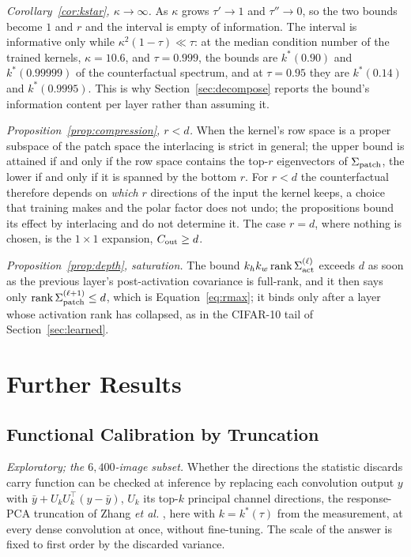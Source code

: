 \documentclass[10pt,journal,compsoc]{IEEEtran}
\begin{document}
\emph{Corollary~\ref{cor:kstar}, $\kappa \to \infty$.} As $\kappa$ grows $\tau' \to 1$ and $\tau'' \to 0$, so the two bounds become $1$ and $r$ and the interval is empty of information. The interval is informative only while $\kappa^2 (1 - \tau) \ll \tau$: at the median condition number of the trained kernels, $\kappa = 10.6$, and $\tau = 0.999$, the bounds are $k^*(0.90)$ and $k^*(0.99999)$ of the counterfactual spectrum, and at $\tau = 0.95$ they are $k^*(0.14)$ and $k^*(0.9995)$. This is why Section~\ref{sec:decompose} reports the bound's information content per layer rather than assuming it.

\emph{Proposition~\ref{prop:compression}, $r < d$.} When the kernel's row space is a proper subspace of the patch space the interlacing is strict in general; the upper bound is attained if and only if the row space contains the top-$r$ eigenvectors of $\Sigma_{\rm patch}$, the lower if and only if it is spanned by the bottom $r$. For $r < d$ the counterfactual therefore depends on \emph{which} $r$ directions of the input the kernel keeps, a choice that training makes and the polar factor does not undo; the propositions bound its effect by interlacing and do not determine it. The case $r = d$, where nothing is chosen, is the $1\!\times\!1$ expansion, $C_{\rm out} \ge d$.

\emph{Proposition~\ref{prop:depth}, saturation.} The bound $k_h k_w \operatorname{rank} \Sigma_{\rm act}^{(\ell)}$ exceeds $d$ as soon as the previous layer's post-activation covariance is full-rank, and it then says only $\operatorname{rank} \Sigma_{\rm patch}^{(\ell+1)} \le d$, which is Equation~\eqref{eq:rmax}; it binds only after a layer whose activation rank has collapsed, as in the CIFAR-10 tail of Section~\ref{sec:learned}.



\clearpage
\section{Further Results}
\label{supp:further}

\subsection*{Functional Calibration by Truncation}
\label{sec:projection}

\emph{Exploratory; the $6{,}400$-image subset.} Whether the directions the
statistic discards carry function can be checked at inference by
replacing each convolution output $y$ with
$\bar y + U_k U_k^{\top}(y - \bar y)$, $U_k$ its top-$k$ principal channel
directions, the response-PCA truncation of Zhang \emph{et al.}
\cite{zhang2016accelerating}, here with $k = k^*(\tau)$ from the
measurement, at every dense convolution at once, without fine-tuning. The
scale of the answer is fixed to first order by the discarded variance.
\end{document}
